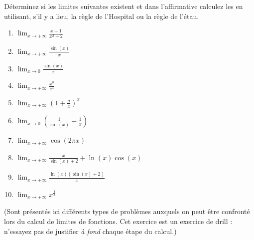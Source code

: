 
\begin{exercice}\label{exo0023}

Déterminez si les limites suivantes existent et dans l'affirmative calculez les en utilisant, s'il y a lieu, la règle de l'Hospital ou la règle de l'étau. 
\begin{multicols}{2}
\begin{enumerate}
	\item $ \lim_{x \rightarrow  +\infty} \frac{x+1}{x^2+2}$
	\item $ \lim_{x \rightarrow  +\infty} \frac{\sin(x)}{x} $
	\item $ \lim_{x \rightarrow  0} \frac{\sin(x)}{x} $
	\item $ \lim_{x \rightarrow  +\infty}  \frac{x ^n}{e ^x} $
	\item $ \lim_{x \rightarrow  +\infty} (1 + \frac{a}{x})^x $
	\item $ \lim_{x \rightarrow  0} (\frac{1}{\sin(x)} - \frac{1}{x} )$
	\item $ \lim_{x \rightarrow  +\infty} \cos( 2 \pi x) $
	\item\label{Item0023h} $ \lim_{x \rightarrow  +\infty} \frac{x}{\sin(x)+2} + \ln(x)\cos(x) $
	\item $ \lim_{x \rightarrow  +\infty} \frac{ \ln(x)(\sin(x) + 2)}{x} $
	\item $ \lim_{x \rightarrow  +\infty} x ^\frac{1}{x} $
\end{enumerate}
\end{multicols}
%
(Sont présentés ici différents types de problèmes auxquels on peut être confronté lors du calcul de limites de fonctions. Cet exercice est un exercice de drill : n'essayez pas de justifier \emph{à fond} chaque étape du calcul.)
%

\end{exercice}
